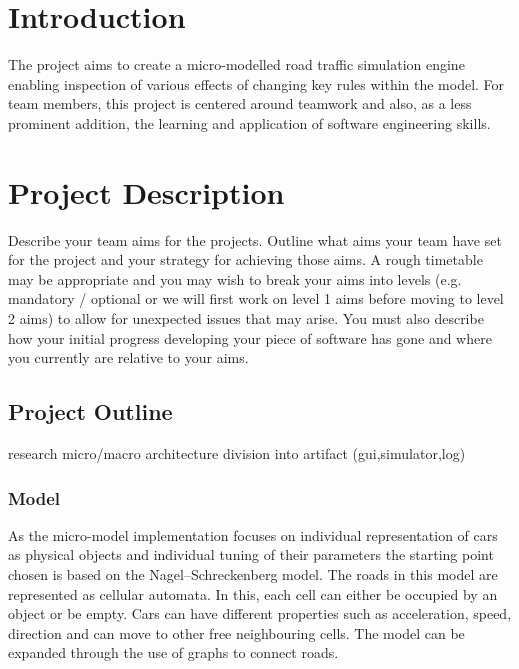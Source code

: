 
\section{Introduction}

The project aims to create a micro-modelled road traffic simulation engine enabling inspection of various effects of changing key rules within the model. For team members, this project is centered around teamwork and also, as a less prominent addition, the learning and application of software engineering skills.

\section{Project Description} %
Describe your team aims for the projects. Outline what aims your team have set for the project and your strategy for
achieving those aims. A rough timetable may be appropriate and you may wish to break your aims into levels
 (e.g. mandatory / optional or we will first work on level 1 aims before moving to level 2 aims) to allow for
 unexpected issues that may arise. You must also describe how your initial progress developing your piece of software
 has gone and where you currently are relative to your aims.


\subsection{Project Outline}


research micro/macro
architecture
division into artifact (gui,simulator,log)




\subsubsection{Model}

As the micro-model implementation focuses on individual representation of cars as physical objects and individual tuning of their parameters the starting point chosen is based on the Nagel–Schreckenberg model. The roads in this model are represented as cellular automata\cite{Schreckenberg}. In this, each cell can either be occupied by an object or be empty. Cars can have different properties such as acceleration, speed, direction and can move to other free neighbouring cells. The model can be expanded through the use of graphs to connect roads.

